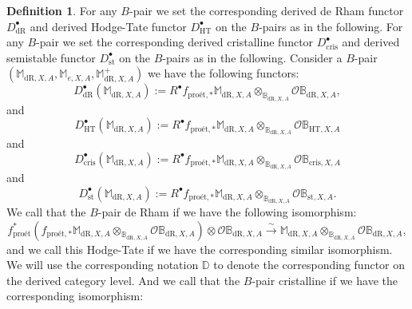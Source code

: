 \documentclass[12pt]{amsart}
\theoremstyle{definition}
\newtheorem{definition}[theorem]{Definition}
\numberwithin{equation}{section}
\begin{document}
\begin{definition} 
For any $B$-pair we set the corresponding derived de Rham functor $D^\bullet_{\mathrm{dR}}$ and derived Hodge-Tate functor $D^\bullet_{\mathrm{HT}}$ on the $B$-pairs as in the following.
For any $B$-pair we set the corresponding derived cristalline functor $D^\bullet_{\mathrm{cris}}$ and derived semistable functor $D^\bullet_{\mathrm{st}}$ on the $B$-pairs as in the following. Consider a $B$-pair $(\mathbb{M}_{\mathrm{dR},X,A}, \mathbb{M}_{e,X,A}, \mathbb{M}^+_{\mathrm{dR},X,A})$ we have the following functors:
\begin{displaymath}
D_{\mathrm{dR}}^\bullet(\mathbb{M}_{\mathrm{dR},X,A}):=R^\bullet f_{\text{pro\'et},*} \mathbb{M}_{\mathrm{dR},X,A}\otimes_{\mathbb{B}_{\mathrm{dR},X,A}}	 \mathcal{O}\mathbb{B}_{\mathrm{dR},X,A},
\end{displaymath}
and
\begin{displaymath}
D_{\mathrm{HT}}^\bullet(\mathbb{M}_{\mathrm{dR},X,A}):=R^\bullet f_{\text{pro\'et},*} \mathbb{M}_{\mathrm{dR},X,A}\otimes_{\mathbb{B}_{\mathrm{dR},X,A}}	 \mathcal{O}\mathbb{B}_{\mathrm{HT},X,A}
\end{displaymath}
and
\begin{displaymath}
D_{\mathrm{cris}}^\bullet(\mathbb{M}_{\mathrm{dR},X,A}):=R^\bullet f_{\text{pro\'et},*} \mathbb{M}_{\mathrm{dR},X,A}\otimes_{\mathbb{B}_{\mathrm{dR},X,A}}	 \mathcal{O}\mathbb{B}_{\mathrm{cris},X,A}
\end{displaymath}
and
\begin{displaymath}
D_{\mathrm{st}}^\bullet(\mathbb{M}_{\mathrm{dR},X,A}):=R^\bullet f_{\text{pro\'et},*} \mathbb{M}_{\mathrm{dR},X,A}\otimes_{\mathbb{B}_{\mathrm{dR},X,A}}	 \mathcal{O}\mathbb{B}_{\mathrm{st},X,A}.
\end{displaymath}
We call that the $B$-pair de Rham if we have the following isomorphism:
\begin{displaymath}
f^*_\text{pro\'et}(f_{\text{pro\'et},*} \mathbb{M}_{\mathrm{dR},X,A}\otimes_{\mathbb{B}_{\mathrm{dR},X,A}}	 \mathcal{O}\mathbb{B}_{\mathrm{dR},X,A})\otimes\mathcal{O}\mathbb{B}_{\mathrm{dR},X,A} \overset{\sim}{\rightarrow} \mathbb{M}_{\mathrm{dR},X,A}\otimes_{\mathbb{B}_{\mathrm{dR},X,A}}	 \mathcal{O}\mathbb{B}_{\mathrm{dR},X,A},
\end{displaymath}
and we call this Hodge-Tate if we have the corresponding similar isomorphism. We will use the corresponding notation $\mathbb{D}$ to denote the corresponding functor on the derived category level. And we call that the $B$-pair cristalline if we have the corresponding isomorphism:

\end{definition}
\end{document}
